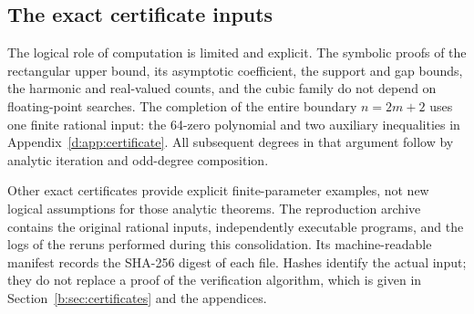 \documentclass[UTF8,11pt]{ctexart}
\theoremstyle{definition}
\numberwithin{equation}{section}
\begin{document}
\subsection{The exact certificate inputs}
The logical role of computation is limited and explicit. The symbolic
proofs of the rectangular upper bound, its asymptotic coefficient, the
support and gap bounds, the harmonic and real-valued counts, and the
cubic family do not depend on floating-point searches. The completion of
the entire boundary $n=2m+2$ uses one finite rational input: the 64-zero
polynomial and two auxiliary inequalities in
Appendix~\ref{d:app:certificate}. All subsequent degrees in that argument
follow by analytic iteration and odd-degree composition.

Other exact certificates provide explicit finite-parameter examples, not
new logical assumptions for those analytic theorems. The reproduction
archive contains the original rational inputs, independently executable
programs, and the logs of the reruns performed during this consolidation.
Its machine-readable manifest records the SHA-256 digest of each file.
Hashes identify the actual input; they do not replace a proof of the
verification algorithm, which is given in Section~\ref{b:sec:certificates}
and the appendices.
\end{document}
